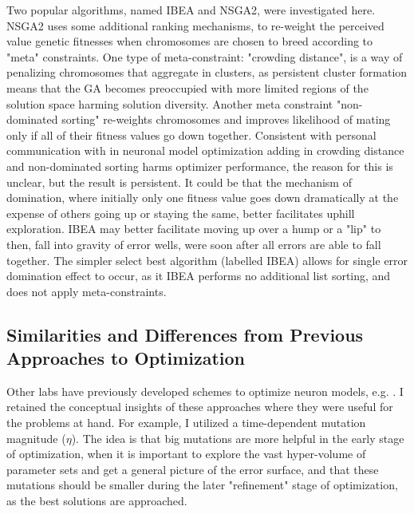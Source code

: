 Two popular algorithms, named IBEA and NSGA2, were investigated here.
NSGA2 uses some additional ranking mechanisms, to re-weight the perceived value genetic fitnesses when chromosomes are chosen to breed according to "meta" constraints. One type of meta-constraint: "crowding distance", is a way of penalizing chromosomes that aggregate in clusters, as persistent cluster formation means that the GA becomes preoccupied with more limited regions of the solution space harming solution diversity. Another meta constraint "non-dominated sorting" re-weights chromosomes and improves likelihood of mating only if all of their fitness values go down together. Consistent with personal communication with \cite{van2007neurofitter} in neuronal model optimization adding in crowding distance and non-dominated sorting harms optimizer performance, the reason for this is unclear, but the result is persistent. It could be that the mechanism of domination, where initially only one fitness value goes down dramatically at the expense of others going up or staying the same, better facilitates uphill exploration. IBEA may better facilitate moving up over a hump or a "lip" to then, fall into gravity of error wells, were soon after all errors are able to fall together. The simpler select best algorithm (labelled IBEA) allows for single error domination effect to occur, as it IBEA performs no additional list sorting, and does not apply meta-constraints.



\subsection{Similarities and Differences from Previous Approaches to Optimization}
Other labs have previously developed schemes to optimize neuron models, e.g. \cite{druckmann2007novel}.
I retained the conceptual insights of these approaches where they were useful for the problems at hand.
For example, I utilized a time-dependent mutation magnitude ($\eta$).
The idea is that big mutations are more helpful in the early stage of optimization, when it is important to explore the vast hyper-volume of parameter sets and get a general picture of the error surface, and that these mutations should be smaller during the later "refinement" stage of optimization, as the best solutions are approached.

